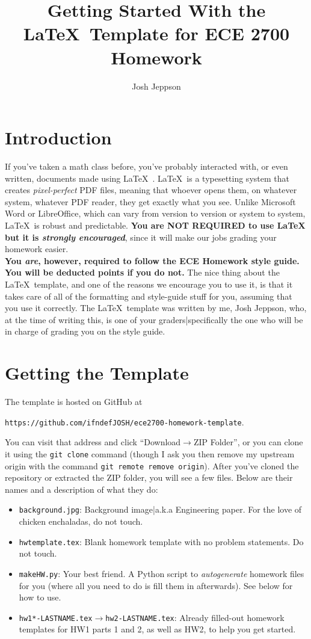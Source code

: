 \documentclass[a4paper,10pt]{article}
\title{Getting Started With the \LaTeX\ Template for ECE 2700 Homework}
\author{Josh Jeppson}
\begin{document}
\maketitle

\section{Introduction}

If you've taken a math class before, you've probably interacted with, or even written, documents made using \LaTeX\ . \LaTeX\ is a typesetting system that creates \emph{pixel-perfect} PDF files, meaning that whoever opens them, on whatever system, whatever PDF reader, they get exactly what you see. Unlike Microsoft Word or LibreOffice, which can vary from version to version or system to system, \LaTeX\ is robust and predictable. \textbf{You are NOT REQUIRED to use \LaTeX\, but it is \textit{strongly encouraged}}, since it will make our jobs grading your homework easier.
\\[10pt]
\textbf{You \emph{are}, however, required to follow the ECE Homework style guide. You will be deducted points if you do not.} The nice thing about the \LaTeX\ template, and one of the reasons we encourage you to use it, is that it takes care of all of the formatting and style-guide stuff for you, assuming that you use it correctly. The \LaTeX\ template was written by me, Josh Jeppson, who, at the time of writing this, is one of your graders|specifically the one who will be in charge of grading you on the style guide.

\section{Getting the Template}

The template is hosted on GitHub at
\begin{center}
\texttt{https://github.com/ifndefJOSH/ece2700-homework-template}.
\end{center}
You can visit that address and click ``Download$\to$ZIP Folder'', or you can clone it using the \texttt{git clone} command (though I ask you then remove my upstream origin with the command \texttt{git remote remove origin}). After you've cloned the repository or extracted the ZIP folder, you will see a few files. Below are their names and a description of what they do:
\begin{itemize}
	\item \texttt{background.jpg}: Background image|a.k.a Engineering paper. For the love of chicken enchaladas, do not touch.
	\item \texttt{hwtemplate.tex}: Blank homework template with no problem statements. Do not touch.
	\item \texttt{makeHW.py}: Your best friend. A Python script to \emph{autogenerate} homework files for you (where all you need to do is fill them in afterwards). See below for how to use.
	\item \texttt{hw1*-LASTNAME.tex}$\to$\texttt{hw2-LASTNAME.tex}: Already filled-out homework templates for HW1 parts 1 and 2, as well as HW2, to help you get started.
\end{itemize}
\end{document}
